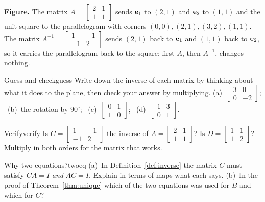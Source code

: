\documentclass[11pt]{article}
\begin{document}
\textbf{Figure.} The matrix $A=\begin{bmatrix}2&1\\1&1\end{bmatrix}$ sends $\mathbf{e}_1$ to $(2,1)$ and $\mathbf{e}_2$ to $(1,1)$ and the unit square to the parallelogram with corners $(0,0),(2,1),(3,2),(1,1)$. The matrix $A^{-1}=\begin{bmatrix}1&-1\\-1&2\end{bmatrix}$ sends $(2,1)$ back to $\mathbf{e}_1$ and $(1,1)$ back to $\mathbf{e}_2$, so it carries the parallelogram back to the square: first $A$, then $A^{-1}$, changes nothing.

\begin{kc}{Guess and check}{guess}
Write down the inverse of each matrix by thinking about what it does to the plane, then check your answer by multiplying. (a)~$\begin{bmatrix}3&0\\0&-2\end{bmatrix}$; \ (b)~the rotation by $90^\circ$; \ (c)~$\begin{bmatrix}0&1\\1&0\end{bmatrix}$; \ (d)~$\begin{bmatrix}1&3\\0&1\end{bmatrix}$.
\end{kc}

\begin{kc}{Verify}{verify}
Is $C=\begin{bmatrix}1&-1\\-1&2\end{bmatrix}$ the inverse of $A=\begin{bmatrix}2&1\\1&1\end{bmatrix}$? Is $D=\begin{bmatrix}1&1\\1&2\end{bmatrix}$? Multiply in both orders for the matrix that works.
\end{kc}

\begin{think}{Why two equations?}{twoeq}
(a)~In Definition~\ref{def:inverse} the matrix $C$ must satisfy $CA=I$ \emph{and} $AC=I$. Explain in terms of maps what each says. (b)~In the proof of Theorem~\ref{thm:unique} which of the two equations was used for $B$ and which for $C$?
\end{think}
\end{document}
